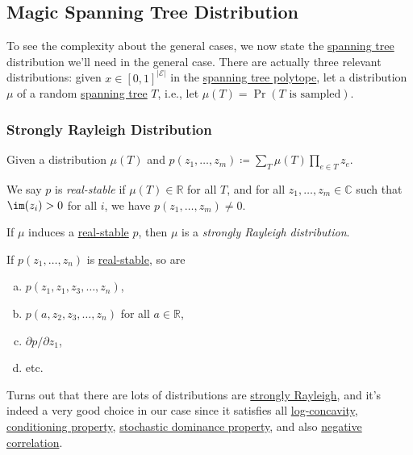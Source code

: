 \subsection{Magic Spanning Tree Distribution}
To see the complexity about the general cases, we now state the \hyperref[def:spanning-tree]{spanning tree} distribution we'll need in the general case. There are actually three relevant distributions: given \(x\in \left[ 0, 1 \right] ^{\left\vert \mathcal{E}  \right\vert }\) in the \hyperref[eq:spanning-tree-polytope]{spanning tree polytope}, let a distribution \(\mu \) of a random \hyperref[def:spanning-tree]{spanning tree} \(T\), i.e., let \(\mu (T) = \Pr(T\text{ is sampled})\).

\subsubsection{Strongly Rayleigh Distribution}
\begin{definition*}
	Given a distribution \(\mu (T)\) and \(p(z_1, \ldots , z_m ) \coloneqq \sum_{T} \mu (T) \prod_{e\in T} z_e\).
	\begin{definition}\label{def:real-stable}
		We say \(p\) is \emph{real-stable} if \(\mu (T)\in \mathbb{R} \) for all \(T\), and for all \(z_1, \ldots  , z_m\in \mathbb{C} \) such that \(\im(z_i) > 0\) for all \(i\), we have \(p(z_1, \ldots , z_m ) \neq 0\).
	\end{definition}
	\begin{definition}\label{def:strongly-Rayleigh-distribution}
		If \(\mu \) induces a \hyperref[def:real-stable]{real-stable} \(p\), then \(\mu\) is a \emph{strongly Rayleigh distribution}.
	\end{definition}
\end{definition*}

\begin{remark}[Closure]
	If \(p(z_1, \ldots , z_n )\) is \hyperref[def:real-stable]{real-stable}, so are
	\begin{enumerate}[(a)]
		\item \(p(z_1, z_1, z_3, \ldots , z_n )\),
		\item \(p(a, z_2, z_3, \ldots , z_n )\) for all \(a\in \mathbb{R}\),
		\item \(\partial p / \partial z_1\),
		\item etc.
	\end{enumerate}
\end{remark}

Turns out that there are lots of distributions are \hyperref[def:strongly-Rayleigh-distribution]{strongly Rayleigh}, and it's indeed a very good choice in our case since it satisfies  all \hyperref[subsub:log-concavity]{log-concavity}, \hyperref[subsub:conditioning]{conditioning property}, \hyperref[subsub:stochastic-dominance]{stochastic dominance property}, and also \hyperref[subsub:negative-correlation]{negative correlation}.

